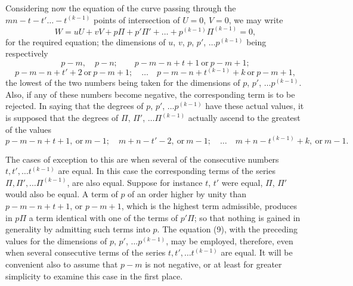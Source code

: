 \documentclass[11pt]{article}
\begin{document}
Considering now the equation of the curve passing through the $mn - t - t' \ldots - t^{(k-1)}$ points of intersection of $U = 0$, $V = 0$, we may write
\[
W = u U + v V + p \Pi + p'\Pi' + \ldots + p^{(k-1)} \Pi^{(k-1)} = 0 \tag{9},
\]
for the required equation; the dimensions of $u$, $v$, $p$, $p'$, $\ldots p^{(k-1)}$ being respectively
\[
p - m,\quad p - n;\qquad p - m - n + t + 1\ \text{or}\ p - m + 1;
\]
\[
p - m - n + t' + 2\ \text{or}\ p - m + 1;\quad \ldots\quad p - m - n + t^{(k-1)} + k\ \text{or}\ p - m + 1,
\]
the lowest of the two numbers being taken for the dimensions of $p$, $p'$, $\ldots p^{(k-1)}$. Also, if any of these numbers become negative, the corresponding term is to be rejected. In saying that the degrees of $p$, $p'$, $\ldots p^{(k-1)}$ have these actual values, it is supposed that the degrees of $\Pi$, $\Pi'$, $\ldots \Pi^{(k-1)}$ actually ascend to the greatest of the values
\[
p - m - n + t + 1,\ \text{or}\ m - 1;\quad m + n - t' - 2,\ \text{or}\ m - 1;\quad \ldots\quad m + n - t^{(k-1)} + k,\ \text{or}\ m - 1.
\]

The cases of exception to this are when several of the consecutive numbers $t, t', \ldots t^{(k-1)}$ are equal. In this case the corresponding terms of the series $\Pi, \Pi', \ldots \Pi^{(k-1)}$, are also equal. Suppose for instance $t$, $t'$ were equal, $\Pi$, $\Pi'$ would also be equal. A term of $p$ of an order higher by unity than $p - m - n + t + 1$, or $p - m + 1$, which is the highest term admissible, produces in $p\Pi$ a term identical with one of the terms of $p'\Pi$; so that nothing is gained in generality by admitting such terms into $p$. The equation (9), with the preceding values for the dimensions of $p$, $p'$, $\ldots p^{(k-1)}$, may be employed, therefore, even when several consecutive terms of the series $t, t', \ldots t^{(k-1)}$ are equal. It will be convenient also to assume that $p - m$ is not negative, or at least for greater simplicity to examine this case in the first place.
\end{document}
